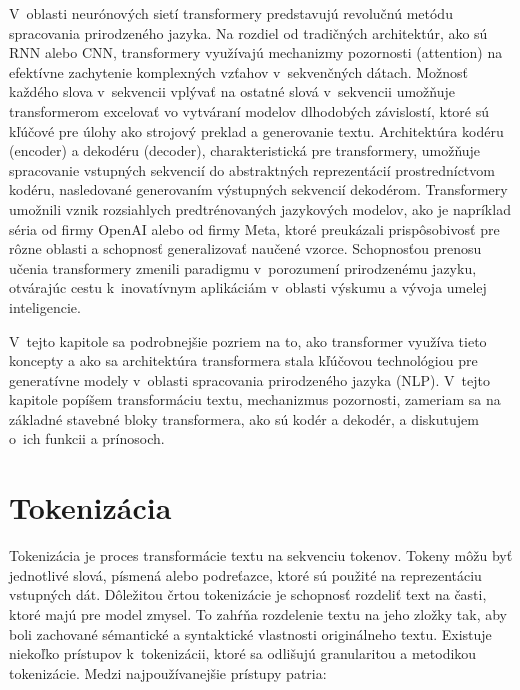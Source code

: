 V~oblasti neurónových sietí transformery predstavujú revolučnú metódu spracovania prirodzeného jazyka. Na rozdiel od tradičných architektúr, ako sú RNN alebo CNN, transformery využívajú mechanizmy pozornosti (attention) na efektívne zachytenie komplexných vzťahov v~sekvenčných dátach. Možnosť každého slova v~sekvencii vplývať na ostatné slová v~sekvencii umožňuje transformerom excelovať vo vytváraní modelov dlhodobých závislostí, ktoré sú kľúčové pre úlohy ako strojový preklad a generovanie textu. Architektúra kodéru (encoder) a dekodéru (decoder), charakteristická pre transformery, umožňuje spracovanie vstupných sekvencií do abstraktných reprezentácií prostredníctvom kodéru, nasledované generovaním výstupných sekvencií dekodérom. Transformery umožnili vznik rozsiahlych predtrénovaných jazykových modelov, ako je napríklad séria \GPT{} od firmy OpenAI alebo \LLAMA{} od firmy Meta, ktoré preukázali prispôsobivosť pre rôzne oblasti a schopnosť generalizovať naučené vzorce. Schopnosťou prenosu učenia transformery zmenili paradigmu v~porozumení prirodzenému jazyku, otvárajúc cestu k~inovatívnym aplikáciám v~oblasti výskumu a vývoja umelej inteligencie.

V~tejto kapitole sa podrobnejšie pozriem na to, ako transformer využíva tieto koncepty a ako sa architektúra transformera stala kľúčovou technológiou pre generatívne modely v~oblasti spracovania prirodzeného jazyka (NLP). V~tejto kapitole popíšem transformáciu textu, mechanizmus pozornosti, zameriam sa na základné stavebné bloky transformera, ako sú kodér a dekodér, a diskutujem o~ich funkcii a prínosoch.

\section{Tokenizácia}

Tokenizácia je proces transformácie textu na sekvenciu tokenov. Tokeny môžu byť jednotlivé slová, písmená alebo podreťazce, ktoré sú použité na reprezentáciu vstupných dát. Dôležitou črtou tokenizácie je schopnosť rozdeliť text na časti, ktoré majú pre model zmysel. To zahŕňa rozdelenie textu na jeho zložky tak, aby boli zachované sémantické a syntaktické vlastnosti originálneho textu. Existuje niekoľko prístupov k~tokenizácii, ktoré sa odlišujú granularitou a metodikou tokenizácie. Medzi najpoužívanejšie prístupy patria:

